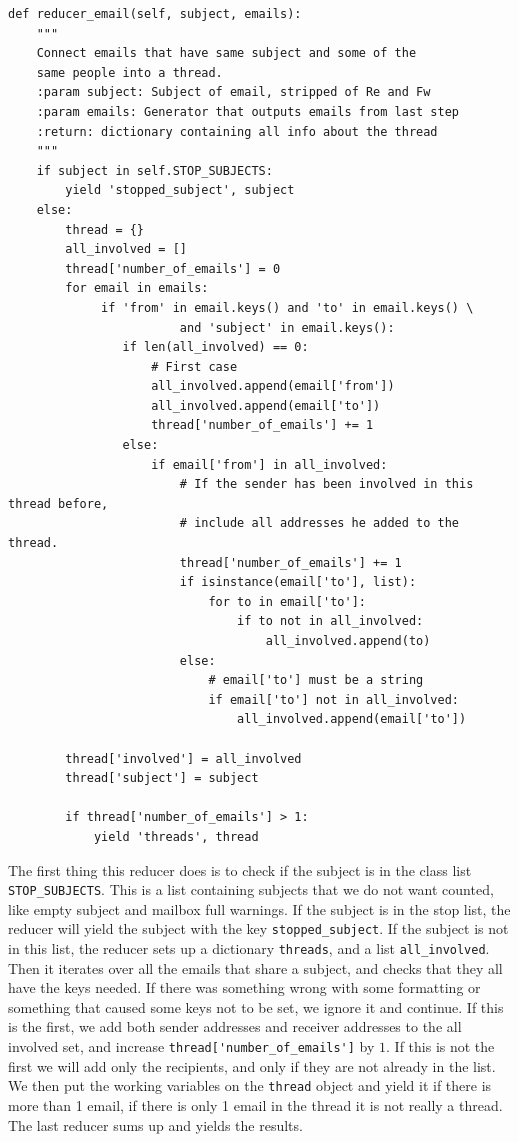 \documentclass[runningheads,a4paper]{llncs}
\begin{document}
\begin{verbatim}
def reducer_email(self, subject, emails):
    """
    Connect emails that have same subject and some of the 
    same people into a thread.
    :param subject: Subject of email, stripped of Re and Fw
    :param emails: Generator that outputs emails from last step
    :return: dictionary containing all info about the thread
    """
    if subject in self.STOP_SUBJECTS:
        yield 'stopped_subject', subject
    else:
        thread = {}
        all_involved = []
        thread['number_of_emails'] = 0
        for email in emails:
             if 'from' in email.keys() and 'to' in email.keys() \
                        and 'subject' in email.keys():
                if len(all_involved) == 0:
                    # First case
                    all_involved.append(email['from'])
                    all_involved.append(email['to'])
                    thread['number_of_emails'] += 1
                else:
                    if email['from'] in all_involved:
                        # If the sender has been involved in this thread before,
                        # include all addresses he added to the thread.
                        thread['number_of_emails'] += 1
                        if isinstance(email['to'], list):
                            for to in email['to']:
                                if to not in all_involved:
                                    all_involved.append(to)
                        else:
                            # email['to'] must be a string
                            if email['to'] not in all_involved:
                                all_involved.append(email['to'])

        thread['involved'] = all_involved
        thread['subject'] = subject

        if thread['number_of_emails'] > 1:
            yield 'threads', thread

\end{verbatim}
The first thing this reducer does is to check if the subject is in the class list \verb!STOP_SUBJECTS!. This is a list containing subjects that we do not want counted, like empty subject and mailbox full warnings. If the subject is in the stop list, the reducer will yield the subject with the key \verb!stopped_subject!. If the subject is not in this list, the reducer sets up a dictionary \verb!threads!, and a list \verb!all_involved!. 
\newline
Then it iterates over all the emails that share a subject, and checks that they all have the keys needed. If there was something wrong with some formatting or something that caused some keys not to be set, we ignore it and continue. If this is the first, we add both sender addresses and receiver addresses to the all involved set, and increase \verb!thread['number_of_emails']! by $1$. If this is not the first we will add only the recipients, and only if they are not already in the list. We then put the working variables on the \verb!thread! object and yield it if there is more than 1 email, if there is only 1 email in the thread it is not really a thread. 
\newline
The last reducer sums up and yields the results.
\end{document}
